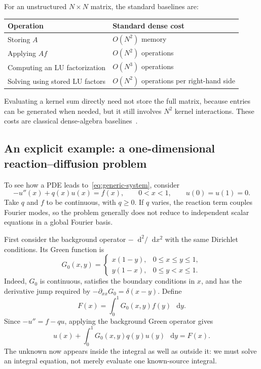 \documentclass[11pt,a4paper]{article}
\newcommand{\dd}{\mathop{}\!\mathrm{d}}
\begin{document}
For an unstructured $N\times N$ matrix, the standard baselines are:
\begin{center}
\begin{tabular}{@{}ll@{}}
\toprule
Operation & Standard dense cost \\
\midrule
Storing $A$ & $O(N^2)$ memory \\
Applying $Af$ & $O(N^2)$ operations \\
Computing an LU factorization & $O(N^3)$ operations \\
Solving using stored LU factors & $O(N^2)$ operations per right-hand side\\
\bottomrule
\end{tabular}
\end{center}
Evaluating a kernel sum directly need not store the full matrix, because entries can be generated when needed, but it still involves $N^2$ kernel interactions. These costs are classical dense-algebra baselines~\cite{golub2013matrix}.

\subsection{An explicit example: a one-dimensional reaction--diffusion problem}
\label{subsec:reaction-diffusion}
To see how a PDE leads to~\eqref{eq:generic-system}, consider
\begin{equation}
    -u''(x)+q(x)u(x)=f(x),\qquad 0<x<1,
    \qquad u(0)=u(1)=0.
    \label{eq:reaction-diffusion}
\end{equation}
Take $q$ and $f$ to be continuous, with $q\ge0$. If $q$ varies, the reaction term couples Fourier modes, so the problem generally does not reduce to independent scalar equations in a global Fourier basis.

First consider the background operator $-\dd^2/\dd x^2$ with the same Dirichlet conditions. Its Green function is
\begin{equation}
    G_0(x,y)=
    \begin{cases}
        x(1-y), & 0\leq x\leq y\leq1,\\
        y(1-x), & 0\leq y<x\leq1.
    \end{cases}
    \label{eq:dirichlet-green}
\end{equation}
Indeed, $G_0$ is continuous, satisfies the boundary conditions in $x$, and has the derivative jump required by $-\partial_{xx}G_0=\delta(x-y)$. Define
\begin{equation}
    F(x)=\int_0^1G_0(x,y)f(y)\,\dd y.
    \label{eq:reaction-source}
\end{equation}
Since $-u''=f-qu$, applying the background Green operator gives
\begin{equation}
    u(x)+\int_0^1G_0(x,y)q(y)u(y)\,\dd y=F(x).
    \label{eq:reaction-integral}
\end{equation}
The unknown now appears inside the integral as well as outside it: we must solve an integral equation, not merely evaluate one known-source integral.
\end{document}
